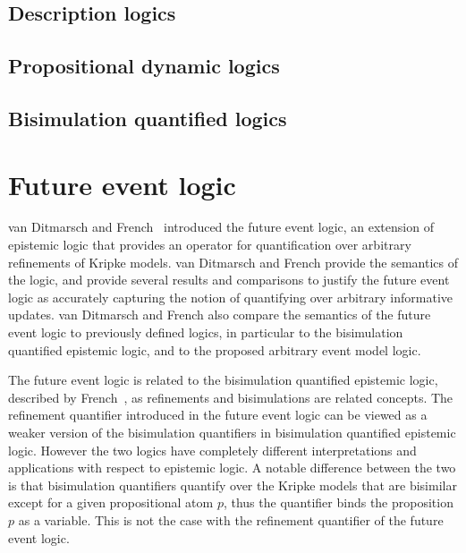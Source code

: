 \subsection*{Description logics}

\subsection*{Propositional dynamic logics}

\subsection*{Bisimulation quantified logics}

\section{Future event logic}

van Ditmarsch and French~\cite{french2009simulation} introduced the future event
logic, an extension of epistemic logic that provides an operator for
quantification over arbitrary refinements of Kripke models. van Ditmarsch and
French provide the semantics of the logic, and provide several results and
comparisons to justify the future event logic as accurately capturing the notion
of quantifying over arbitrary informative updates. van Ditmarsch and French also 
compare the semantics of the future event logic to previously defined logics, in
particular to the bisimulation quantified epistemic logic, and to the proposed
arbitrary event model logic.

The future event logic is related to the bisimulation quantified epistemic
logic, described by French~\cite{french2006bisimulation}, as refinements and
bisimulations are related concepts. The refinement quantifier introduced in the
future event logic can be viewed as a weaker version of the bisimulation
quantifiers in bisimulation quantified epistemic logic. However the two logics
have completely different interpretations and applications with respect to
epistemic logic. A notable difference between the two is that bisimulation
quantifiers quantify over the Kripke models that are bisimilar except for a
given propositional atom $p$, thus the quantifier binds the proposition $p$ as a
variable. This is not the case with the refinement quantifier of the future
event logic. %

